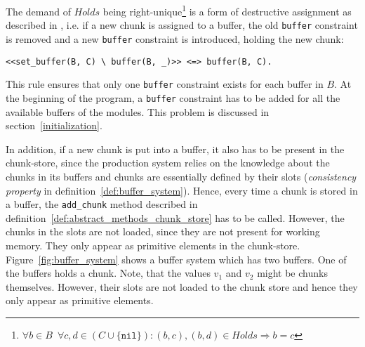 The demand of $Holds$ being right-unique\footnote{$\forall b \in B \enspace \forall c, d \in (C \cup \{ \mathtt{nil} \}): (b,c), (b,d) \in Holds \Rightarrow b = c$} is a form of destructive assignment as described in \cite[p. 32]{fru_chr_book_2009}, i.e. if a new chunk is assigned to a buffer, the old \lstinline|buffer| constraint is removed and a new \lstinline|buffer| constraint is introduced, holding the new chunk:

\begin{lstlisting}
<<set_buffer(B, C) \ buffer(B, _)>> <=> buffer(B, C).
\end{lstlisting}

This rule ensures that only one \lstinline|buffer| constraint exists for each buffer in $B$. At the beginning of the program, a \lstinline|buffer| constraint has to be added for all the available buffers of the modules. This problem is discussed in section~\ref{initialization}.

In addition, if a new chunk is put into a buffer, it also has to be present in the chunk-store, since the production system relies on the knowledge about the chunks in its buffers and chunks are essentially defined by their slots (\emph{consistency property} in definition~\ref{def:buffer_system}). Hence, every time a chunk is stored in a buffer, the \lstinline|add_chunk| method described in definition~\ref{def:abstract_methods_chunk_store} has to be called. However, the chunks in the slots are not loaded, since they are not present for working memory. They only appear as primitive elements in the chunk-store. Figure~\ref{fig:buffer_system} shows a buffer system which has two buffers. One of the buffers holds a chunk. Note, that the values $v_1$ and $v_2$ might be chunks themselves. However, their slots are not loaded to the chunk store and hence they only appear as primitive elements.

